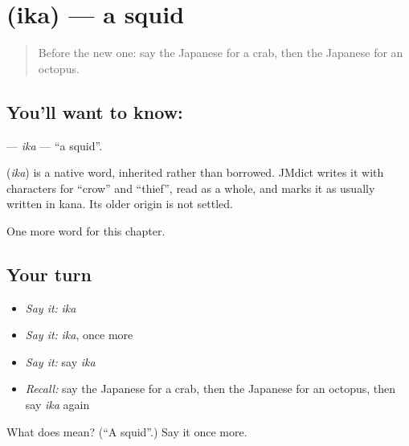 \section[\texorpdfstring{\ja{いか} (ika)}{いか (ika)}]{ (ika) — a squid}

\label{lesson:JA-C47-ika}



\begin{quote}
Before the new one: say the Japanese for a crab, then the Japanese for an octopus.
\end{quote}

\subsection*{You'll want to know: }
\textbf{} — \emph{ika} — \textquotedblleft{}a squid\textquotedblright{}.

\begin{cousinweb}
\textbf{} (\emph{ika}) is a native word, inherited rather than borrowed. JMdict writes it with characters for \textquotedblleft{}crow\textquotedblright{} and \textquotedblleft{}thief\textquotedblright{}, read as a whole, and marks it as usually written in kana. Its older origin is not settled.
\end{cousinweb}

\begin{grammarlens}[title={What you've built}]
One more word for this chapter.
\end{grammarlens}

\subsection*{Your turn}
\begin{itemize}
\raggedright
  \item \emph{Say it:} \emph{ika}
  \item \emph{Say it:} \emph{ika}, once more
  \item \emph{Say it:} say \emph{ika}
  \item \emph{Recall:} say the Japanese for a crab, then the Japanese for an octopus, then say \emph{ika} again
\end{itemize}

\begin{tcolorbox}[breakable,colback=teal!4,colframe=teal!35!black,title={Before you move on}]
What does  mean? (\textquotedblleft{}A squid\textquotedblright{}.) Say it once more.
\end{tcolorbox}

